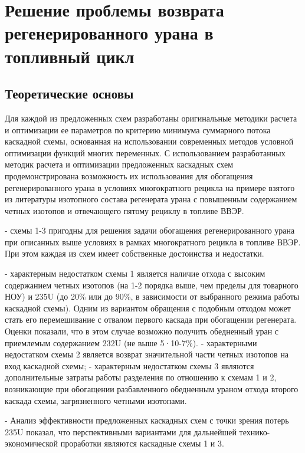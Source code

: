 \chapter{Решение проблемы возврата регенерированного урана в топливный цикл}\label{ch:ch3}

\section{Теоретические основы}






Для каждой из предложенных схем разработаны оригинальные методики расчета и оптимизации ее параметров по критерию минимума суммарного потока каскадной схемы, основанная на использовании современных методов условной оптимизации функций многих переменных. С использованием разработанных методик расчета и оптимизации предложенных каскадных схем продемонстрирована возможность их использования для обогащения регенерированного урана в условиях многократного рецикла на примере взятого из литературы изотопного состава регенерата урана с повышенным содержанием четных изотопов и отвечающего пятому рециклу в топливе ВВЭР.

-	схемы 1-3 пригодны для решения задачи обогащения регенерированного урана при описанных выше условиях в рамках многократного рецикла в топливе ВВЭР. При этом каждая из схем имеет собственные достоинства и недостатки. 

-	характерным недостатком схемы 1 является наличие отхода с высоким содержанием четных изотопов (на 1-2 порядка выше, чем пределы для товарного НОУ) и 235U (до 20\% или до 90\%, в зависимости от выбранного режима работы каскадной схемы). Одним из вариантом обращения с подобным отходом может стать его перемешивание с отвалом первого каскада при обогащении регенерата. Оценки показали, что в этом случае возможно получить обедненный уран с приемлемым содержанием 232U (не выше 5·10-7\%).
-	характерными недостатком схемы 2 является возврат значительной части четных изотопов на вход каскадной схемы;
-	характерным недостатком схемы 3 являются дополнительные затраты работы разделения по отношению к схемам 1 и 2, возникающие при обогащении разбавленного обедненным ураном отхода второго каскада схемы, загрязненного четными изотопами.

-	 Анализ эффективности предложенных каскадных схем с точки зрения потерь 235U показал, что перспективными вариантами для дальнейшей технико-экономической проработки являются каскадные схемы 1 и 3.




